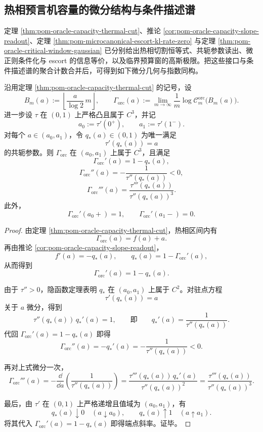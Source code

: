 \subsection{热相预言机容量的微分结构与条件描述谱}

定理 \ref{thm:pom-oracle-capacity-thermal-cut}、推论 \ref{cor:pom-oracle-capacity-slope-readout}、定理 \ref{thm:pom-microcanonical-escort-kl-rate-zero} 与定理 \ref{thm:pom-oracle-critical-window-gaussian} 已分别给出热相切割恒等式、共轭参数读出、微正则条件化与 escort 的信息等价，以及临界预算窗的高斯极限。把这些接口与条件描述谱的聚合计数合并后，可得到如下微分几何与指数同构。

\begin{theorem}[热相预言机容量指数的微分几何]\label{thm:derived-oracle-thermal-differential-geometry}
沿用定理 \ref{thm:pom-oracle-capacity-thermal-cut} 的记号，设
\[
B_m(a):=\left\lfloor \frac{a}{\log 2}\,m\right\rfloor,
\qquad
\Gamma_{\mathrm{orc}}(a):=\lim_{m\to\infty}\frac1m\log \mathcal{C}^{\mathrm{orc}}_m\bigl(B_m(a)\bigr).
\]
进一步设 \(\tau\) 在 \((0,1)\) 上严格凸且属于 \(C^3\)，并记
\[
a_0:=\tau'(0^+),
\qquad
a_1:=\tau'(1^-).
\]
对每个 \(a\in(a_0,a_1)\)，令 \(q_*(a)\in(0,1)\) 为唯一满足
\[
\tau'(q_*(a))=a
\]
的共轭参数。则 \(\Gamma_{\mathrm{orc}}\) 在 \((a_0,a_1)\) 上属于 \(C^3\)，且满足
\[
\Gamma_{\mathrm{orc}}'(a)=1-q_*(a),
\]
\[
\Gamma_{\mathrm{orc}}''(a)=-\frac{1}{\tau''(q_*(a))}<0,
\]
\[
\Gamma_{\mathrm{orc}}'''(a)=\frac{\tau'''(q_*(a))}{\tau''(q_*(a))^3}.
\]
此外，
\[
\Gamma_{\mathrm{orc}}'(a_0+)=1,
\qquad
\Gamma_{\mathrm{orc}}'(a_1-)=0.
\]
\end{theorem}
\begin{proof}
由定理 \ref{thm:pom-oracle-capacity-thermal-cut}，热相区间内有
\[
\Gamma_{\mathrm{orc}}(a)=f(a)+a.
\]
再由推论 \ref{cor:pom-oracle-capacity-slope-readout}，
\[
f'(a)=-q_*(a),
\qquad
q_*(a)=1-\Gamma_{\mathrm{orc}}'(a),
\]
从而得到
\[
\Gamma_{\mathrm{orc}}'(a)=1-q_*(a).
\]

由于 \(\tau''>0\)，隐函数定理表明 \(q_*\) 在 \((a_0,a_1)\) 上属于 \(C^2\)。对驻点方程
\[
\tau'(q_*(a))=a
\]
关于 \(a\) 微分，得到
\[
\tau''(q_*(a))\,q_*'(a)=1,
\qquad\text{即}\qquad
q_*'(a)=\frac{1}{\tau''(q_*(a))}.
\]
代回 \(\Gamma_{\mathrm{orc}}'(a)=1-q_*(a)\) 即得
\[
\Gamma_{\mathrm{orc}}''(a)=-q_*'(a)=-\frac{1}{\tau''(q_*(a))}<0.
\]

再对上式微分一次，
\[
\Gamma_{\mathrm{orc}}'''(a)
=-\frac{\dd}{\dd a}\left(\frac{1}{\tau''(q_*(a))}\right)
=\frac{\tau'''(q_*(a))\,q_*'(a)}{\tau''(q_*(a))^2}
=\frac{\tau'''(q_*(a))}{\tau''(q_*(a))^3}.
\]

最后，由 \(\tau'\) 在 \((0,1)\) 上严格递增且值域为 \((a_0,a_1)\)，有
\[
q_*(a)\downarrow 0 \quad (a\downarrow a_0),
\qquad
q_*(a)\uparrow 1 \quad (a\uparrow a_1).
\]
将其代入 \(\Gamma_{\mathrm{orc}}'(a)=1-q_*(a)\) 即得端点斜率。证毕。
\end{proof}

